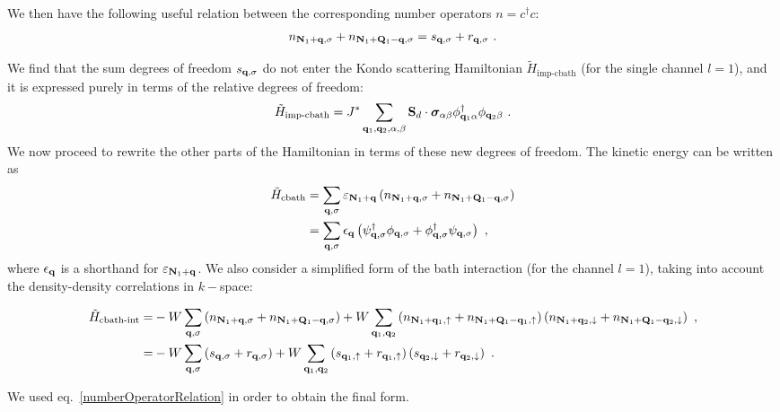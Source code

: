 \documentclass[reprint,hidelinks,onecolumn]{revtex4-2}
\begin{document}
We then have the following useful relation between the corresponding number operators \(n = c^\dagger c\):
\begin{equation}\begin{aligned}\label{numberOperatorRelation}
	n_{{\bf N}_1 + {\bf q},\sigma} + n_{{\bf N}_1 + {\bf Q}_1 - {\bf q}, \sigma} = s_{{\bf q}, \sigma} + r_{{\bf q},\sigma}~.
\end{aligned}\end{equation}

We find that the sum degrees of freedom \(s_{{\bf q},\sigma}\) do not enter the Kondo scattering Hamiltonian \(\tilde H_\text{imp-cbath}\) (for the single channel \(l=1\)), and it is expressed purely in terms of the relative degrees of freedom:
\begin{equation}\begin{aligned}
	\tilde H_\text{imp-cbath} = J^*\sum_{{\bf q}_1, {\bf q}_2,\alpha,\beta}{\bf S}_d\cdot{\boldsymbol\sigma}_{\alpha\beta} {\phi}^\dagger_{{\bf q}_1\alpha} \phi_{{\bf q}_2\beta}~.
\end{aligned}\end{equation}
We now proceed to rewrite the other parts of the Hamiltonian in terms of these new degrees of freedom. The kinetic energy can be written as
\begin{equation}\begin{aligned}\label{kineticEnergy}
	\tilde H_\text{cbath} &= \sum_{{\bf q},\sigma}\varepsilon_{{\bf N}_1 + {\bf q}}\left(n_{{\bf N}_1 + {\bf q},\sigma} + n_{{\bf N}_1 + {\bf Q}_1 - {\bf q},\sigma}\right)\\
						  &= \sum_{{\bf q},\sigma}\epsilon_{{\bf q}}\left({\psi}^\dagger_{{\bf q},\sigma} {\phi}_{{\bf q},\sigma} + {\phi}^\dagger_{{\bf q},\sigma} \psi_{{\bf q},\sigma}\right)~,
\end{aligned}\end{equation}
where \(\epsilon_{{\bf q}}\) is a shorthand for \(\varepsilon_{{\bf N}_1 + {\bf q}}\).
We also consider a simplified form of the bath interaction (for the channel \(l=1\)), taking into account the density-density correlations in \(k-\)space:
\begin{widetext}
\begin{equation}\begin{aligned}
	\tilde H_\text{cbath-int} =& -W\sum_{{\bf q},\sigma}\left(n_{{\bf N}_1 + {\bf q},\sigma} + n_{{\bf N}_1 + {\bf Q}_1 - {\bf q},\sigma}\right) + W\sum_{{\bf q}_1,{\bf q}_2}\left(n_{{\bf N}_{1} + {\bf q}_1, \uparrow} + n_{{\bf N}_{1} + {\bf Q}_{1} - {\bf q}_1, \uparrow} \right) \left( n_{{\bf N}_{1} + {\bf q}_2, \downarrow} + n_{{\bf N}_{1} + {\bf Q}_{1} - {\bf q}_2, \downarrow} \right)~,\\
	=& -W\sum_{{\bf q},\sigma}\left(s_{{\bf q},\sigma} + r_{{\bf q},\sigma}\right) + W\sum_{{\bf q}_1,{\bf q}_2}\left(s_{{\bf q}_1,\uparrow} + r_{{\bf q}_1,\uparrow}\right) \left(s_{{\bf q}_2,\downarrow} + r_{{\bf q}_2,\downarrow}\right)~.
\end{aligned}\end{equation}
\end{widetext}
We used eq.~\ref{numberOperatorRelation} in order to obtain the final form. 
\end{document}
